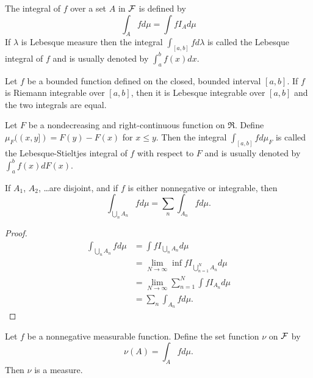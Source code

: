 \begin{definition}
The integral of $f$ over a set $A$ in $\mathcal F$ is defined by
\begin{equation*}
\int_A fd\mu = \int fI_A d\mu
\end{equation*}
If $\lambda$ is Lebesque measure then the integral $\int_{[a,b]}f d\lambda$ is called the Lebesque integral of $f$ and is usually denoted by $\int_{a}^{b} f(x)dx$.
\end{definition}



\begin{theorem}
Let $f$ be a bounded function defined on the closed, bounded interval $[a,b]$. If $f$ is Riemann integrable over $[a,b]$, then it is Lebesque integrable over $[a,b]$ and the two integrals are equal.
\end{theorem}



\begin{definition}
Let $F$ be a nondecreasing and right-continuous function on $\Re$. Define $\mu_F((x,y])=F(y)-F(x)$ for $x\leq y$. Then the integral $\int_{[a,b]}f d\mu_F$ is called the Lebesque-Stieltjes integral of $f$ with respect to $F$ and is usually denoted by $\int_{a}^{b}f(x)dF(x)$.
\end{definition}



\begin{lemma}
If $A_1$, $A_2$, \ldots are disjoint, and if $f$ is either nonnegative or integrable, then
\begin{equation*}
\int_{\bigcup_n A_n} fd\mu = \sum_n \int_{A_n} f d\mu.
\end{equation*}
\end{lemma}




\begin{proof}
\begin{align*}
\int_{\bigcup_n A_n} f d\mu &= \int fI_{\bigcup_n A_n} d\mu\\
	&=\lim\limits_{N\to\infty}\inf fI_{\bigcup_{n=1}^N A_n}d\mu\\
	&=\lim\limits_{N\to\infty}\sum_{n=1}^{N}\int f I_{A_n}d\mu\\
	&=\sum_n\int_{A_n} f d\mu.
\end{align*}
\end{proof}



\begin{theorem}
Let $f$ be a nonnegative measurable function. Define the set function $\nu$ on $\mathcal F$ by
\begin{equation*}
\nu(A)=\int_A f d\mu.
\end{equation*}
Then $\nu$ is a measure.
\end{theorem}




